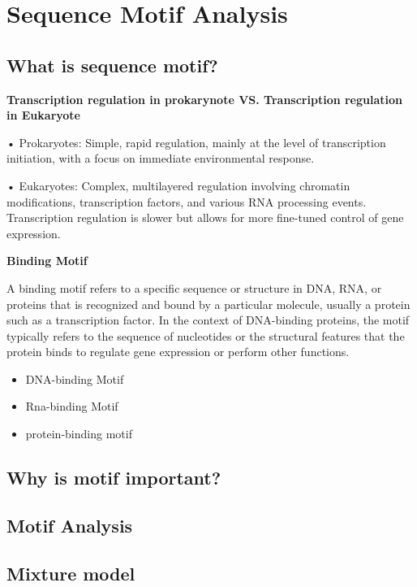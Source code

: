 \documentclass{article}
\begin{document}
\section{Sequence Motif Analysis}
\subsection{What is sequence motif?}
\textbf{Transcription regulation in prokarynote VS. Transcription regulation in Eukaryote}


•	Prokaryotes: Simple, rapid regulation, mainly at the level of transcription initiation, with a focus on immediate environmental response.

•	Eukaryotes: Complex, multilayered regulation involving chromatin modifications, transcription factors, and various RNA processing events. Transcription regulation is slower but allows for more fine-tuned control of gene expression.

\textbf{Binding Motif}

A binding motif refers to a specific sequence or structure in DNA, RNA, or proteins that is recognized and bound by a particular molecule, usually a protein such as a transcription factor. In the context of DNA-binding proteins, the motif typically refers to the sequence of nucleotides or the structural features that the protein binds to regulate gene expression or perform other functions.

\begin{itemize}
    \item DNA-binding Motif
    \item Rna-binding Motif
    \item protein-binding motif
\end{itemize}

\subsection{Why is motif important?}
\subsection{Motif Analysis}
\subsection{Mixture model}
\end{document}

